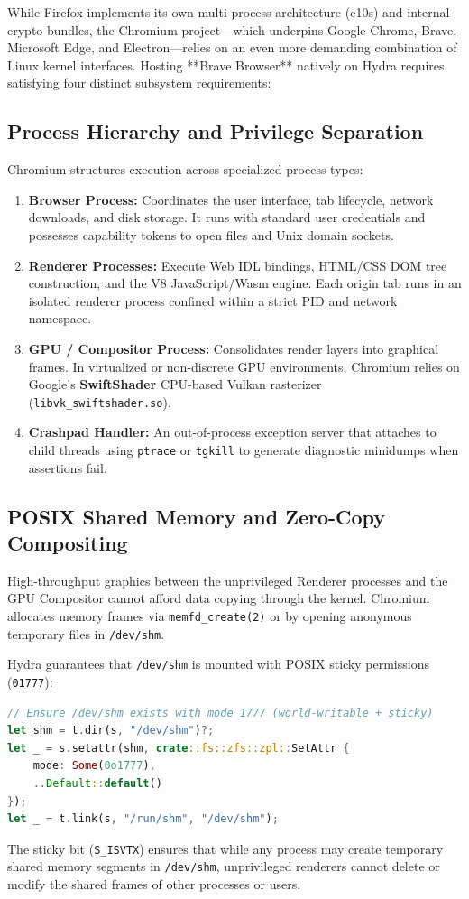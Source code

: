 While Firefox implements its own multi-process architecture (e10s) and internal crypto bundles, the Chromium project—which underpins Google Chrome, Brave, Microsoft Edge, and Electron—relies on an even more demanding combination of Linux kernel interfaces. Hosting **Brave Browser** natively on Hydra requires satisfying four distinct subsystem requirements:

\subsection{Process Hierarchy and Privilege Separation}
Chromium structures execution across specialized process types:
\begin{enumerate}
    \item \textbf{Browser Process:} Coordinates the user interface, tab lifecycle, network downloads, and disk storage. It runs with standard user credentials and possesses capability tokens to open files and Unix domain sockets.
    \item \textbf{Renderer Processes:} Execute Web IDL bindings, HTML/CSS DOM tree construction, and the V8 JavaScript/Wasm engine. Each origin tab runs in an isolated renderer process confined within a strict PID and network namespace.
    \item \textbf{GPU / Compositor Process:} Consolidates render layers into graphical frames. In virtualized or non-discrete GPU environments, Chromium relies on Google's \textbf{SwiftShader} CPU-based Vulkan rasterizer (\texttt{libvk\_swiftshader.so}).
    \item \textbf{Crashpad Handler:} An out-of-process exception server that attaches to child threads using \texttt{ptrace} or \texttt{tgkill} to generate diagnostic minidumps when assertions fail.
\end{enumerate}

\subsection{POSIX Shared Memory and Zero-Copy Compositing}
High-throughput graphics between the unprivileged Renderer processes and the GPU Compositor cannot afford data copying through the kernel. Chromium allocates memory frames via \texttt{memfd\_create(2)} or by opening anonymous temporary files in \texttt{/dev/shm}. 

Hydra guarantees that \texttt{/dev/shm} is mounted with POSIX sticky permissions (\texttt{01777}):
\begin{lstlisting}[language=Rust, caption={Hydra POSIX Shared Memory Initialization}]
// Ensure /dev/shm exists with mode 1777 (world-writable + sticky)
let shm = t.dir(s, "/dev/shm")?;
let _ = s.setattr(shm, crate::fs::zfs::zpl::SetAttr {
    mode: Some(0o1777),
    ..Default::default()
});
let _ = t.link(s, "/run/shm", "/dev/shm");
\end{lstlisting}
The sticky bit (\texttt{S\_ISVTX}) ensures that while any process may create temporary shared memory segments in \texttt{/dev/shm}, unprivileged renderers cannot delete or modify the shared frames of other processes or users.


